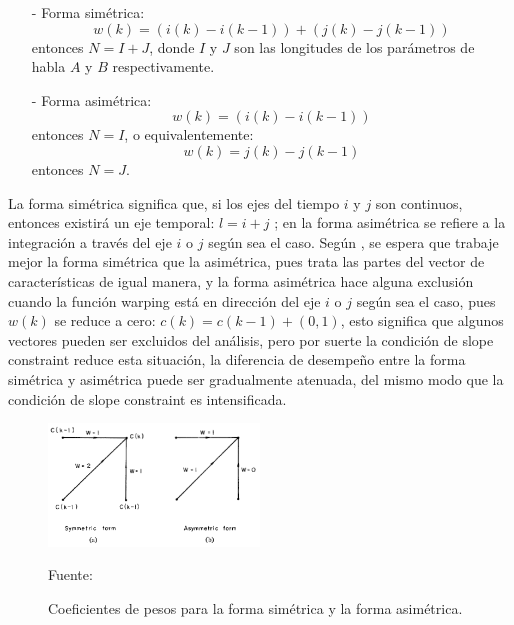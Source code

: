 \begin{enumerate}
\begin{enumerate}
\begin{enumerate}
\item[-]Forma simétrica:
\begin{equation}
\label{eq:ecuacion89}
w(k) = (i(k) - i(k - 1)) + (j(k) - j(k - 1))
\end{equation}
entonces $N = I + J$, donde $I$ y $J$ son las longitudes de los parámetros de habla $A$ y $B$ respectivamente.
\item[-]Forma asimétrica:
\begin{equation}
\label{eq:ecuacion90}
w(k) = (i(k) - i(k-1))
\end{equation}
entonces $N = I$, o equivalentemente:
\begin{equation}
\label{eq:ecuacion91}
w(k) = j(k) - j(k - 1)
\end{equation}
\vskip -0.2cm
entonces $N = J$.
\end{enumerate}

La forma simétrica significa que, si los ejes del tiempo $i$ y $j$ son continuos, entonces existirá un eje temporal: $l = i + j$ ; en la forma asimétrica se refiere a la integración a través del eje $i$ o $j$ según sea el caso. Según \citep{sakoe}, se espera que trabaje mejor la forma simétrica que la asimétrica, pues trata las partes del vector de características de igual manera, y la forma asimétrica hace alguna exclusión cuando la función warping está en dirección del eje $i$ o $j$ según sea el caso, pues $w(k)$ se reduce a cero: $c(k) = c(k-1)+(0,1)$, esto significa que algunos vectores pueden ser excluidos del análisis, pero por suerte la condición de slope constraint reduce esta situación, la diferencia de desempeño entre la forma simétrica y asimétrica puede ser gradualmente atenuada, del mismo modo que la condición de slope constraint es intensificada.

\begin{figure}[H]
\begin{center}
\includegraphics[width=0.5\textwidth]{Imagenes/Cap2/image055}
\end{center}
\begin{center}
\vskip -0.5cm
\caption{\small{Coeficientes de pesos para la forma simétrica y la forma asimétrica.}}
\label{fig:figura2.54}
{\small{Fuente: \cite{sakoe}}}
\end{center}
\end{figure}


\end{enumerate}
\end{enumerate}
